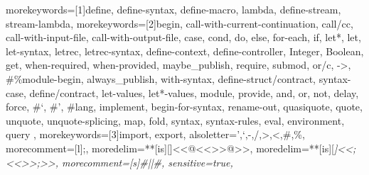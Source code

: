\usepackage{listings}
\usepackage{soul}




 {
  morekeywords=[1]{define, define-syntax, define-macro, lambda, define-stream, stream-lambda},
  morekeywords=[2]{begin, call-with-current-continuation, call/cc,
    call-with-input-file, call-with-output-file, case, cond,
    do, else, for-each, if,
    let*, let, let-syntax, letrec, letrec-syntax,
    define-context, define-controller, Integer, Boolean, get, when-required, when-provided,
    maybe_publish, require, submod, or/c, ->, \#\%module-begin,
    always_publish, with-syntax, define-struct/contract, syntax-case,
    define/contract,
    let-values, let*-values,
    module, provide,
    and, or, not, delay, force,
    \#`, \#',
    \#lang, implement, begin-for-syntax, rename-out,
    quasiquote, quote, unquote, unquote-splicing,
    map, fold, syntax, syntax-rules, eval, environment, query },
  morekeywords=[3]{import, export},
  alsoletter={',`,-,/,>,<,\#,\%},
  morecomment=[l]{;},
  moredelim=**[is][\color{light-gray}]{<<@<<}{>>@>>},
  moredelim=**[is][\itshape\color{OliveGreen}]{<<;<<}{>>;>>},
  morecomment=[s]{\#|}{|\#},
  sensitive=true,
}


\def\inlineracket{\lstinline[basicstyle=\ttfamily\normalsize,language=racket]}

